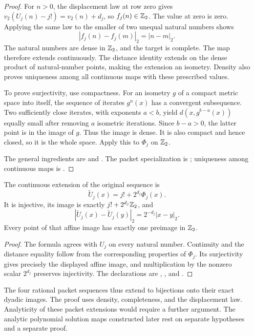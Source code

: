 \begin{proof}
For $n>0$, the displacement law at row zero gives
$v_2(U_j(n)-j!)=v_2(n)+d_j$, so $f_j(n)\in\mathbb Z_2$.
The value at zero is zero.  Applying the same law to the smaller of two
unequal natural numbers shows
\[
 |f_j(n)-f_j(m)|_2=|n-m|_2.
\]
The natural numbers are dense in $\mathbb Z_2$, and the target is complete.
The map therefore extends continuously.  The distance identity extends
on the dense product of natural-number points, making the extension
an isometry.  Density also proves uniqueness among all continuous maps
with these prescribed values.

To prove surjectivity, use compactness.  For an isometry $g$ of a compact
metric space into itself, the sequence of iterates $g^n(x)$ has a
convergent subsequence.  Two sufficiently close iterates, with exponents
$a<b$, yield $d(x,g^{b-a}(x))$ equally small after removing $a$ isometric
iterations.  Since $b-a>0$, the latter point is in the image of $g$.
Thus the image is dense.  It is also compact and hence closed, so it is
the whole space.  Apply this to $\Phi_j$ on $\mathbb Z_2$.

The general ingredients are
 and
.
The packet specialization is
;
uniqueness among continuous maps is
.
\end{proof}

\begin{corollary}
\label{cor:arith-affine-image}
The continuous extension of the original sequence is
\[
 \widetilde U_j(x)=j!+2^{d_j}\Phi_j(x).
\]
It is injective, its image is exactly $j!+2^{d_j}\mathbb Z_2$, and
\[
 |\widetilde U_j(x)-\widetilde U_j(y)|_2
     =2^{-d_j}|x-y|_2.
\]
Every point of that affine image has exactly one preimage in $\mathbb Z_2$.
\end{corollary}

\begin{proof}
The formula agrees with $U_j$ on every natural number.  Continuity and
the distance equality follow from the corresponding properties of
$\Phi_j$.  Its surjectivity gives precisely the displayed affine image,
and multiplication by the nonzero scalar $2^{d_j}$ preserves injectivity.
The declarations are
,
, and
.
\end{proof}

The four rational packet sequences thus extend to bijections onto their
exact dyadic images.  The proof uses density, completeness, and the
displacement law.  Analyticity of these packet extensions would require
a further argument.  The analytic polynomial solution maps constructed
later rest on separate hypotheses and a separate proof.
